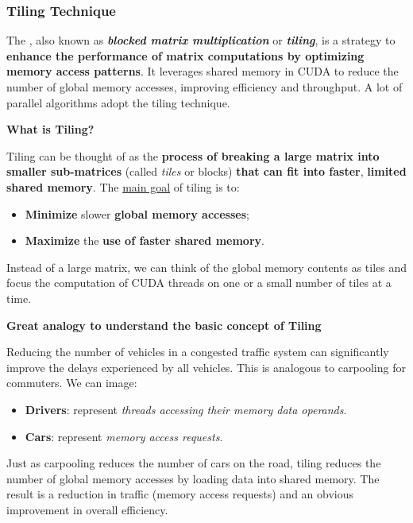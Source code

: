 \subsubsection{Tiling Technique}\label{subsubsection: Tiling Technique}

The , also known as \textbf{\emph{blocked matrix multiplication}} or \textbf{\emph{tiling}}, is a strategy to \textbf{enhance the performance of matrix computations by optimizing memory access patterns}. It leverages shared memory in CUDA to reduce the number of global memory accesses, improving efficiency and throughput. A lot of parallel algorithms adopt the tiling technique.

\highspace
\begin{flushleft}
    \textcolor{Green3}{ \textbf{What is Tiling?}}
\end{flushleft}
Tiling can be thought of as the \textbf{process of breaking a large matrix into smaller sub-matrices} (called \emph{tiles} or blocks) \textbf{that can fit into faster}, \textbf{limited shared memory}. The \underline{main goal} of tiling is to:
\begin{itemize}
    \item \textbf{Minimize} slower \textbf{global memory accesses};
    \item \textbf{Maximize} the \textbf{use of faster shared memory}.
\end{itemize}
Instead of a large matrix, we can think of the global memory contents as tiles and focus the computation of CUDA threads on one or a small number of tiles at a time.

\highspace
\begin{flushleft}
    \textcolor{Green3}{ \textbf{Great analogy to understand the basic concept of Tiling}}
\end{flushleft}
Reducing the number of vehicles in a congested traffic system can significantly improve the delays experienced by all vehicles. This is analogous to carpooling for commuters. We can image:
\begin{itemize}
    \item \textbf{Drivers}: represent \emph{threads accessing their memory data operands}.
    \item \textbf{Cars}: represent \emph{memory access requests}.
\end{itemize}
Just as carpooling reduces the number of cars on the road, tiling reduces the number of global memory accesses by loading data into shared memory. The result is a reduction in traffic (memory access requests) and an obvious improvement in overall efficiency.

